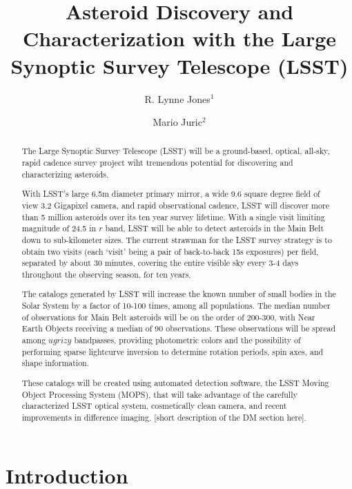 \documentclass{iau}
\title[Asteroids in LSST] %
{Asteroid Discovery and Characterization with the Large Synoptic Survey Telescope (LSST)}
\author[R. Lynne Jones \& Mario Juric]   %
{R. Lynne Jones$^1$
 \and Mario Juric$^2$}
\affiliation{$^1$University of Washington\\ email: {\tt lynnej@uw.edu} \\[\affilskip]
$^2$University of Washington \\email: {\tt mjuric@astro.astro.washington.edu}}
\begin{document}
\maketitle

\begin{abstract}
The Large Synoptic Survey Telescope (LSST) will be a ground-based,
optical, all-sky, rapid cadence survey project wiht tremendous
potential for discovering and characterizing asteroids.

With LSST's large 6.5m diameter primary mirror, a wide 9.6 square
degree field of view 3.2 Gigapixel camera, and rapid observational
cadence, LSST will discover more than 5 million asteroids over its ten
year survey lifetime. With a single visit limiting magnitude of 24.5
in $r$ band, LSST will be able to detect asteroids in the Main Belt
down to sub-kilometer sizes.  The current strawman for the LSST survey
strategy is to obtain two visits (each `visit' being a pair of
back-to-back 15s exposures) per field, separated by about 30 minutes,
covering the entire visible sky every 3-4 days throughout the
observing season, for ten years.

The catalogs generated by LSST will increase the known number of small
bodies in the Solar System by a factor of 10-100 times, among all
populations. The median number of observations for Main Belt asteroids
will be on the order of 200-300, with Near Earth Objects receiving a
median of 90 observations. These observations will be spread among
$ugrizy$ bandpasses, providing photometric colors and the possibility
of performing sparse lightcurve inversion to determine rotation
periods, spin axes, and shape information.

These catalogs will be created using automated detection software, the
LSST Moving Object Processing System (MOPS), that will take advantage
of the carefully characterized LSST optical system, cosmetically
clean camera, and recent improvements in difference imaging. [short
description of the DM section here].
\end{abstract}

\firstsection %
\section{Introduction}
\end{document}

